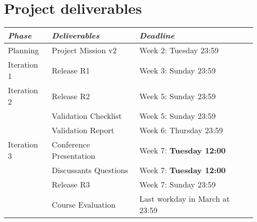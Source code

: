 \documentclass[10pt,a4paper]{article}
\begin{document}
\section{Project deliverables}
\begin{tabular}{l |l p{5cm}  l}
{\it Phase} & {\it Deliverables} & {\it Deadline} \\
\hline
Planning    & Project Mission v2      & Week 2: Tuesday 23:59\\
Iteration 1 & Release R1              & Week 3: Sunday    23:59 \\
Iteration 2 & Release R2              & Week 5: Sunday    23:59 \\
            & Validation Checklist    & Week 5: Sunday    23:59 \\
            & Validation Report       & Week 6: Thursday  23:59 \\
Iteration 3 & Conference Presentation & Week 7: \textbf{Tuesday   12:00}\\
            & Discussants Questions   & Week 7: \textbf{Tuesday   12:00}\\
            & Release R3              & Week 7: Sunday   23:59\\
            & Course Evaluation       & Last workday in March at 23:59  \\

\end{tabular}
\vskip3mm
\end{document}
